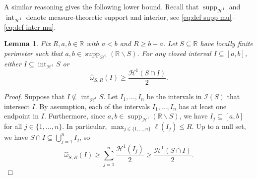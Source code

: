 \documentclass[11pt,reqno]{amsart}
\newcommand{\R}{\mathbb{R}}
\newcommand{\cH}{\mathcal{H}}
\newcommand{\cI}{\mathcal{I}}
\newcommand{\0}{\mathbf{0}}
\renewcommand{\1}{\mathbf 1}
\renewcommand{\subset}{\subseteq}
\renewcommand{\ge}{\geqslant}
\renewcommand{\le}{\leqslant}
\renewcommand{\setminus}{\smallsetminus}
\newcommand{\n}{\{1,\ldots,n\}}
\newtheorem{lemma}[thm]{Lemma}
\theoremstyle{remark}
\DeclareMathOperator{\inter}{int}
\DeclareMathOperator{\supp}{supp}
\begin{document}
A similar reasoning gives the following lower bound.  Recall that $\supp_{\cH^1}$ and $\inter_{\cH^1}$ denote measure-theoretic support and interior, see \eqref{eq:def supp mu}--\eqref{eq:def inter mu}.
\begin{lemma}\label{lem:BWB extended}
 Fix $R,a,b\in \R$ with $a<b$ and  $R\ge b-a$.  Let $S\subset\R$ have locally finite perimeter such that $a,b\in \supp_{\cH^1} (\R\setminus S)$.  For any closed interval $I\subset [a,b]$, either $I \subset \inter_{\cH^1} S$ or
  $$\widehat{\omega}_{S, R}(I) \ge \frac{\cH^1(S\cap I)}{2}.$$
\end{lemma}
\begin{proof}
  Suppose that $I \not \subset \inter_{\cH^1} S$.  Let $I_1,\dots, I_n$ be the intervals in $\cI(S)$ that intersect $I$.  By assumption, each of the intervals $I_1,\dots, I_n$  has at least one endpoint in $I$.  Furthermore, since $a,b\in \supp_{\cH^1} (\R\setminus S)$, we have $I_j\subset [a,b]$ for all $j\in \n$. In particular, $\max_{j\in \n}\ell(I_j)\le R$.  Up to a null set, we have $S\cap I\subset \bigcup_{j=1}^n I_j$, so
  \begin{equation*}
  \widehat{\omega}_{S, R}(I)\ge \sum_{j=1}^n \frac{\cH^1(I_{j})}{2} \ge \frac{\cH^1(S\cap I)}{2}.\tag*{\qedhere}
  \end{equation*}
\end{proof}
\end{document}
